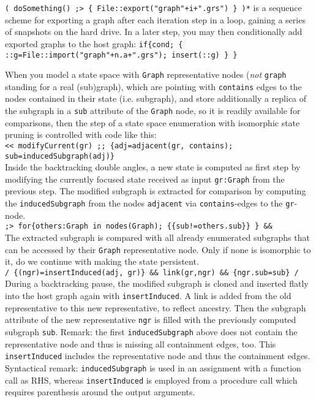 \begin{example}
\verb#( doSomething() ;> { File::export("graph"+i+".grs") } )*# is a sequence scheme for exporting a graph after each iteration step in a loop, gaining a series of snapshots on the hard drive.
In a later step, you may then conditionally add exported graphs to the host graph: 
\verb#if{cond; { ::g=File::import("graph"+n.a+".grs"); insert(::g) } }#
\end{example}

\begin{example}
When you model a state space with \texttt{Graph} representative nodes (\emph{not} \texttt{graph} standing for a real (sub)graph), which are pointing with \texttt{contains} edges to the nodes contained in their state (i.e. subgraph), and store additionally a replica of the subgraph in a \texttt{sub} attribute of the \texttt{Graph} node, so it is readily available for comparisons,
then the step of a state space enumeration with isomorphic state pruning is controlled with code like this:\\
\verb#<< modifyCurrent(gr) ;; {adj=adjacent(gr, contains); sub=inducedSubgraph(adj)}#\\
Inside the backtracking double angles, a new state is computed as first step by modifying the currently focused state received as input \texttt{gr:Graph} from the previous step. The modified subgraph is extracted for comparison by computing the \texttt{inducedSubgraph} from the nodes \texttt{adjacent} via \texttt{contains}-edges to the \texttt{gr}-node.\\
\verb#;> for{others:Graph in nodes(Graph); {{sub!=others.sub}} } && #\\
The extracted subgraph is compared with all already enumerated subgraphs that can be accessed by their \texttt{Graph} representative node. Only if none is isomorphic to it, do we continue with making the state persistent.\\
\verb#/ {(ngr)=insertInduced(adj, gr)} && link(gr,ngr) && {ngr.sub=sub} /#\\
During a backtracking pause, the modified subgraph is cloned and inserted flatly into the host graph again with \texttt{insertInduced}. A link is added from the old representative to this new representative, to reflect ancestry. Then the subgraph attribute of the new representative \texttt{ngr} is filled with the previously computed subgraph \texttt{sub}. Remark: the first \texttt{inducedSubgraph} above does not contain the representative node and thus is missing all containment edges, too. This \texttt{insertInduced} includes the representative node and thus the containment edges. Syntactical remark: \texttt{inducedSubgraph} is used in an assignment with a function call as RHS, whereas \texttt{insertInduced} is employed from a procedure call which requires parenthesis around the output arguments.\\

\end{example}

